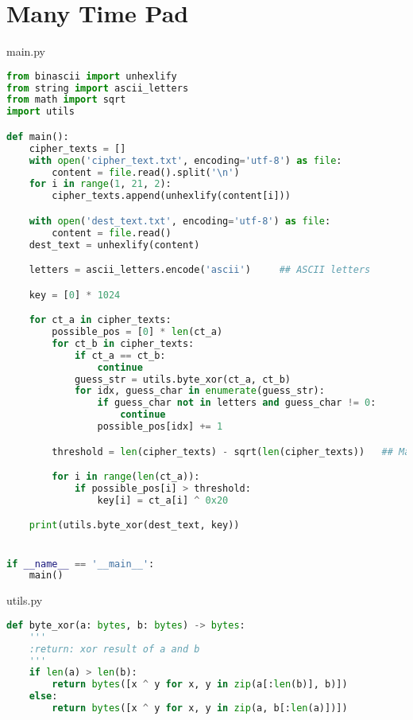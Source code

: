 \section{Many Time Pad}
\label{appendix:mtp}
main.py
\begin{lstlisting}[language = Python]
from binascii import unhexlify
from string import ascii_letters
from math import sqrt
import utils

def main():
    cipher_texts = []
    with open('cipher_text.txt', encoding='utf-8') as file:
        content = file.read().split('\n')
    for i in range(1, 21, 2):
        cipher_texts.append(unhexlify(content[i]))

    with open('dest_text.txt', encoding='utf-8') as file:
        content = file.read()
    dest_text = unhexlify(content)

    letters = ascii_letters.encode('ascii')     ## ASCII letters

    key = [0] * 1024

    for ct_a in cipher_texts:
        possible_pos = [0] * len(ct_a)
        for ct_b in cipher_texts:
            if ct_a == ct_b:
                continue
            guess_str = utils.byte_xor(ct_a, ct_b)
            for idx, guess_char in enumerate(guess_str):
                if guess_char not in letters and guess_char != 0:
                    continue
                possible_pos[idx] += 1

        threshold = len(cipher_texts) - sqrt(len(cipher_texts))   ## Magic threshold

        for i in range(len(ct_a)):
            if possible_pos[i] > threshold:
                key[i] = ct_a[i] ^ 0x20

    print(utils.byte_xor(dest_text, key))


if __name__ == '__main__':
    main()
\end{lstlisting}

\newpage
utils.py
\begin{lstlisting}[language = Python]
def byte_xor(a: bytes, b: bytes) -> bytes:
    '''
    :return: xor result of a and b
    '''
    if len(a) > len(b):
        return bytes([x ^ y for x, y in zip(a[:len(b)], b)])
    else:
        return bytes([x ^ y for x, y in zip(a, b[:len(a)])])
\end{lstlisting}


\newpage
